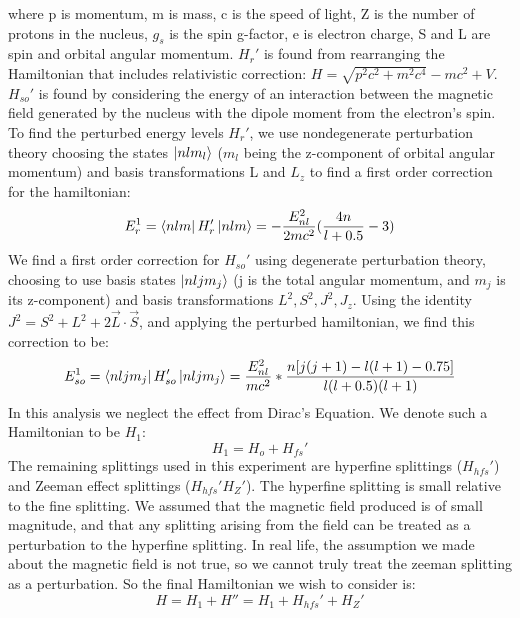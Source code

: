 \documentclass{article}
\begin{document}
    where p is momentum, m is mass, c is the speed of light, Z is the number of protons in the nucleus, $g_s$ is the spin g-factor, e is electron charge, S and L are spin and orbital angular momentum.%
    $H_r'$ is found from rearranging the Hamiltonian that includes relativistic correction: $H = \sqrt{p^2c^2 + m^2c^4} - mc^2 + V$. $H_{so}'$ is found by considering the energy of an interaction between the magnetic field generated by the nucleus with the dipole moment from the electron's spin. \\\indent To find the perturbed energy levels $H_r'$, we use nondegenerate perturbation theory choosing the states $\ket{nlm_l}$ ($m_l$ being the z-component of orbital angular momentum) and basis transformations L and $L_z$ to find a first order correction for the hamiltonian:
    \begin{equation}
        E_{r}^1 = \bra{nlm}H_r'\ket{nlm} = -\frac{E_{nl}^2}{2mc^2}(\frac{4n}{l+0.5} - 3)
    \end{equation}
    We find a first order correction for $H_{so}'$ using degenerate perturbation theory, choosing to use basis states $\ket{nljm_j}$ (j is the total angular momentum, and $m_j$ is its z-component) and basis transformations $L^2,S^2,J^2,J_z$. Using the identity $J^2 = S^2 + L^2 + 2\vec{L}\cdot\vec{S}$, and applying the perturbed hamiltonian, we find this correction to be:
    \begin{equation}
        E_{so}^1 = \bra{nljm_j}H_{so}'\ket{nljm_j} = \frac{E_{nl}^2}{mc^2}*\frac{n[j(j+1) - l(l+1)-0.75]}{l(l+0.5)(l+1)}
    \end{equation}
    In this analysis we neglect the effect from Dirac's Equation. We denote such a Hamiltonian to be $H_1$:
    \begin{equation}
        H_1 = H_o + H_{fs}'
    \end{equation}
    The remaining splittings used in this experiment are hyperfine splittings ($H_{hfs}'$) and Zeeman effect splittings ($H_{hfs}'
H_{Z}'$). The hyperfine splitting is small relative to the fine splitting. We assumed that the magnetic field produced is of small magnitude, and that any splitting arising from the field can be treated as a perturbation to the hyperfine splitting. In real life, the assumption we made about the magnetic field is not true, so we cannot truly treat the zeeman splitting as a perturbation. So the final Hamiltonian we wish to consider is:
    \begin{equation}
        H = H_1 + H'' = H_1 + H_{hfs}' + H_{Z}'
    \end{equation}
\end{document}
